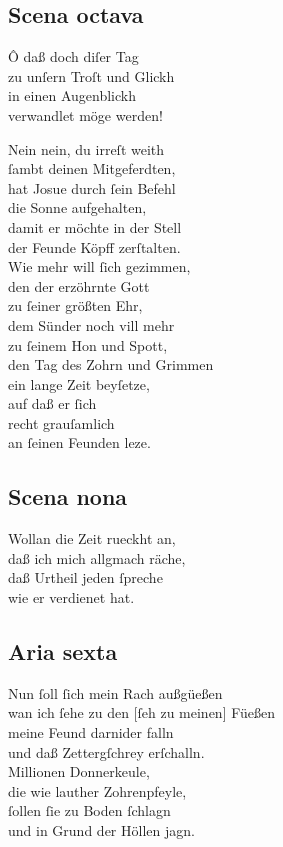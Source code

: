 \documentclass{ees}
\newenvironment{lyrics}[1]{%
  \subsection{#1}\nopagebreak%
  \begin{lyricslist}%
  \let\voice\item%
}{%
  \end{lyricslist}%
}
\begin{document}
\begin{lyrics}{Scena octava}
  \voice[Judas]
  Ô daß doch diſer Tag\\
  zu unſern Troſt und Glickh\\
  in einen Augenblickh\\
  verwandlet möge werden!

  \voice[St: Michael]
  Nein nein, du irreſt weith\\
  ſambt deinen Mitgeferdten,\\
  hat Josue durch ſein Befehl\\
  die Sonne aufgehalten,\\
  damit er möchte in der Stell\\
  der Feunde Köpff zerſtalten.\\
  Wie mehr will ſich gezimmen,\\
  den der erzöhrnte Gott\\
  zu ſeiner größten Ehr,\\
  dem Sünder noch vill mehr\\
  zu ſeinem Hon und Spott,\\
  den Tag des Zohrn und Grimmen\\
  ein lange Zeit beyſetze,\\
  auf daß er ſich\\
  recht grauſamlich\\
  an ſeinen Feunden leze.
\end{lyrics}

\begin{lyrics}{Scena nona}
  \voice[Judex]
  Wollan die Zeit rueckht an,\\
  daß ich mich allgmach räche,\\
  daß Urtheil jeden ſpreche\\
  wie er verdienet hat.
\end{lyrics}

\begin{lyrics}{Aria sexta}
  \voice[Judex]
  Nun ſoll ſich mein Rach außgüeßen\\
  wan ich ſehe zu den [ſeh zu meinen] Füeßen\\
  meine Feund darnider falln\\
  und daß Zettergſchrey erſchalln.\\[1ex]
  Millionen Donnerkeule,\\
  die wie lauther Zohrenpfeyle,\\
  ſollen ſie zu Boden ſchlagn\\
  und in Grund der Höllen jagn.
\end{lyrics}
\end{document}
